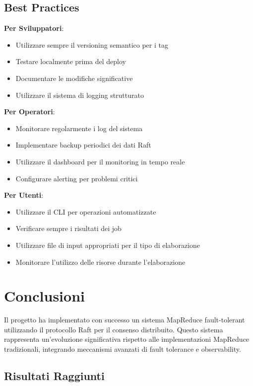 \documentclass[12pt,a4paper]{article}
\begin{document}
\subsection{Best Practices}

\textbf{Per Sviluppatori}:
\begin{itemize}
\item Utilizzare sempre il versioning semantico per i tag
\item Testare localmente prima del deploy
\item Documentare le modifiche significative
\item Utilizzare il sistema di logging strutturato
\end{itemize}

\textbf{Per Operatori}:
\begin{itemize}
\item Monitorare regolarmente i log del sistema
\item Implementare backup periodici dei dati Raft
\item Utilizzare il dashboard per il monitoring in tempo reale
\item Configurare alerting per problemi critici
\end{itemize}

\textbf{Per Utenti}:
\begin{itemize}
\item Utilizzare il CLI per operazioni automatizzate
\item Verificare sempre i risultati dei job
\item Utilizzare file di input appropriati per il tipo di elaborazione
\item Monitorare l'utilizzo delle risorse durante l'elaborazione
\end{itemize}

\section{Conclusioni}

Il progetto ha implementato con successo un sistema MapReduce fault-tolerant utilizzando il protocollo Raft per il consenso distribuito. Questo sistema rappresenta un'evoluzione significativa rispetto alle implementazioni MapReduce tradizionali, integrando meccanismi avanzati di fault tolerance e observability.

\subsection{Risultati Raggiunti}
\end{document}
